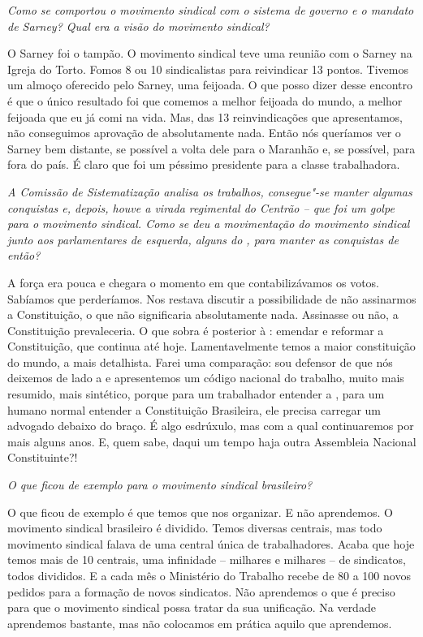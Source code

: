 \medskip

\noindent\emph{Como se comportou o movimento sindical com o sistema de governo
e o mandato de Sarney? Qual era a visão do movimento sindical?}

O Sarney foi o tampão. O movimento sindical teve
uma reunião com o Sarney na Igreja do Torto. Fomos 8 ou 10 sindicalistas
para reivindicar 13 pontos. Tivemos um almoço oferecido pelo Sarney, uma
feijoada. O que posso dizer desse encontro é que o único resultado foi
que comemos a melhor feijoada do mundo, a melhor feijoada que eu já comi
na vida. Mas, das 13 reinvindicações que apresentamos, não conseguimos
aprovação de absolutamente nada. Então nós queríamos ver o Sarney bem
distante, se possível a volta dele para o Maranhão e, se possível, para
fora do país. É claro que foi um péssimo presidente para a classe
trabalhadora.

\medskip

\noindent\emph{A Comissão de Sistematização analisa os trabalhos, consegue"-se
manter algumas conquistas e, depois, houve a virada regimental do
Centrão -- que foi um golpe para o movimento sindical. Como se deu a
movimentação do movimento sindical junto aos parlamentares de esquerda,
alguns do , para manter as conquistas de então?}

A força era pouca e chegara o momento em que
contabilizávamos os votos. Sabíamos que perderíamos. Nos restava
discutir a possibilidade de não assinarmos a Constituição, o que não
significaria absolutamente nada. Assinasse ou não, a Constituição
prevaleceria. O que sobra é posterior à : emendar e reformar a
Constituição, que continua até hoje. Lamentavelmente temos a maior
constituição do mundo, a mais detalhista. Farei uma comparação: sou
defensor de que nós deixemos de lado a  e apresentemos um código
nacional do trabalho, muito mais resumido, mais sintético, porque para
um trabalhador entender a , para um humano normal entender a
Constituição Brasileira, ele precisa carregar um advogado debaixo do
braço. É algo esdrúxulo, mas com a qual continuaremos por mais alguns
anos. E, quem sabe, daqui um tempo haja outra Assembleia Nacional
Constituinte?!

\medskip

\noindent\emph{O que ficou de exemplo para o movimento sindical brasileiro?}

O que ficou de exemplo é que temos que nos
organizar. E não aprendemos. O movimento sindical brasileiro é dividido.
Temos diversas centrais, mas todo movimento sindical falava de uma
central única de trabalhadores. Acaba que hoje temos mais de 10
centrais, uma infinidade -- milhares e milhares -- de sindicatos, todos
divididos. E a cada mês o Ministério do Trabalho recebe de 80 a 100
novos pedidos para a formação de novos sindicatos. Não aprendemos o que
é preciso para que o movimento sindical possa tratar da sua unificação.
Na verdade aprendemos bastante, mas não colocamos em prática aquilo que
aprendemos.

